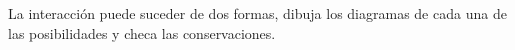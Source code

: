 \documentclass[./../main.tex]{subfiles}
\begin{document}
    \begin{exercise}
        La interacción  puede suceder de dos formas, dibuja los diagramas de cada una de las posibilidades y checa las conservaciones.
    \end{exercise}
\end{document}

